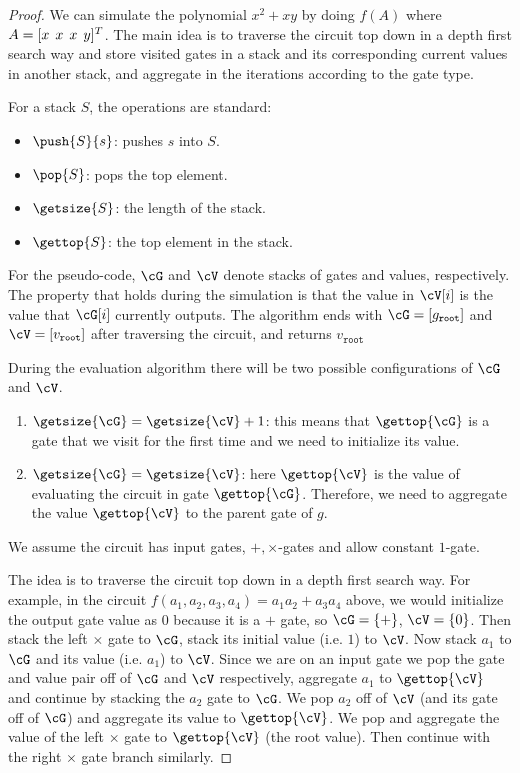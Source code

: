 \begin{proof}
We can simulate the polynomial $x^2+xy$ by doing $f(A)$ where $A=[x \hspace{1ex} x \hspace{1ex} x \hspace{1ex} y]^T$. The main idea is to traverse the circuit top down in a depth first search way and store visited gates in a stack and its corresponding current values in another stack, and aggregate in the iterations according to the gate type.

For a stack $S$, the operations are standard:

\begin{itemize}
	\item $\push{S}{s}$: pushes $s$ into $S$.
	\item $\pop{S}$: pops the top element.
	\item $\getsize{S}$: the length of the stack.
	\item $\gettop{S}$: the top element in the stack.
\end{itemize}

For the pseudo-code, $\cG$ and $\cV$ denote stacks of gates and values, respectively. The property that holds during the simulation is that the value in $\cV[i]$ is the value that $\cG[i]$ currently outputs. The algorithm ends with $\cG=\left[ g_{\texttt{root}}\right]$ and $\cV=\left[ v_{\texttt{root}}\right]$ after traversing the circuit, and returns $v_{\texttt{root}}$

During the evaluation algorithm there will be two possible configurations of $\cG$ and $\cV$.

\begin{enumerate}
	\item $\getsize{\cG} = \getsize{\cV} + 1$: this means that $\gettop{\cG}$ is a gate that we visit for the first time and we need to initialize its value.
	
	\item $\getsize{\cG} = \getsize{\cV}$: here $\gettop{\cV}$ is the value of evaluating the circuit in gate $\gettop{\cG}$. Therefore, we need to aggregate the value $\gettop{\cV}$ to the parent gate of $g$.
\end{enumerate}

We assume the circuit has input gates, $+, \times$-gates and allow constant $1$-gate.

The idea is to traverse the circuit top down in a depth first search way. For example, in the circuit $f(a_1,a_2,a_3,a_4)=a_1a_2 +a_3a_4$ above, we would initialize the output gate value as $0$ because it is a $+$ gate, so $\cG=\lbrace +\rbrace$, $\cV=\lbrace 0\rbrace$. Then stack the left $\times$ gate to $\cG$, stack its initial value (i.e. $1$) to $\cV$. Now stack $a_1$ to $\cG$ and its value (i.e. $a_1$) to $\cV$. Since we are on an input gate we pop the gate and value pair off of $\cG$ and $\cV$ respectively, aggregate $a_1$ to $\gettop{\cV}$ and continue by stacking the $a_2$ gate to $\cG$. We pop $a_2$ off of $\cV$ (and its gate off of $\cG$) and aggregate its value to $\gettop{\cV}$. We pop and aggregate the value of the left $\times$ gate to $\gettop{\cV}$ (the root value). Then continue with the right $\times$ gate branch similarly.


\end{proof}
